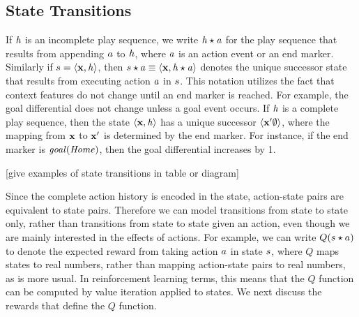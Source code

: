 \documentclass[]{article}
\begin{document}
\subsection{State Transitions} 

If $\it{h}$ is an incomplete play sequence, we write $\it{h} \star a$ for the play sequence that results from appending $a$ to $\it{h}$, where $a$ is an action event or an end marker. Similarly if $s = \langle \mathbf{x}, \it{h} \rangle$, then $s \star a \equiv \langle \mathbf{x}, \it{h} \star a \rangle$ denotes the unique successor state that results from executing action $a$ in  $s$. This notation utilizes the fact that context features do not change until an end marker is reached. For example, the goal differential does not change unless a goal event occurs. If $\it{h}$ is a complete play sequence, then the state $\langle \mathbf{x}, \it{h} \rangle$ has a  unique successor $\langle \mathbf{x}' \emptyset \rangle$, where the mapping from $\mathbf{x}$ to $\mathbf{x}'$ is determined by the end marker. For instance, if the end marker is $\it{goal}(Home)$, then the goal differential increases by 1. 

[give examples of state transitions in table or diagram]

Since the complete action history is encoded in the state, action-state pairs are equivalent to state pairs. Therefore we can model transitions from state to state only, rather than transitions from state to state given an action, even though we are mainly interested in the effects of actions. For example, we can write $Q(s \star a)$ to denote the expected reward from taking action $a$ in state $s$, where $Q$ maps states to real numbers, rather than mapping action-state pairs to real numbers, as is more usual. In reinforcement learning terms, this means that the $Q$ function can be computed by value iteration applied to states. We next discuss the rewards that define the $Q$ function.



%
%
%
\end{document}

